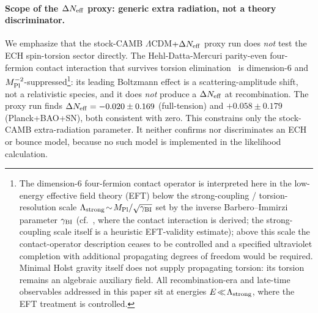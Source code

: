 \documentclass[aps,prd,twocolumn,superscriptaddress,showpacs,preprintnumbers,nofootinbib,longbibliography,floatfix]{revtex4-2}
\newcommand{\MPl}{M_{\rm Pl}}
\newcommand{\Neff}{N_{\rm eff}}
\newcommand{\cf}{cf.}
\begin{document}
\paragraph{Scope of the $\Delta\Neff$ proxy: generic extra radiation, not a theory discriminator.}
We emphasize that the stock-CAMB $\Lambda$CDM$+\Delta\Neff$ proxy run does
\emph{not} test the ECH spin-torsion sector directly. The Hehl-Datta-Mercuri
parity-even four-fermion contact interaction that survives torsion
elimination~\cite{Hehl1976,Mercuri2006} is dimension-6 and $M_{\rm Pl}^{-2}$-suppressed\footnote{The
dimension-6 four-fermion contact operator is interpreted here in the
low-energy effective field theory (EFT) below the strong-coupling /
torsion-resolution scale $\Lambda_{\rm strong}\!\sim\!\MPl/\sqrt{\gamma_{\rm BI}}$
set by the inverse Barbero--Immirzi parameter $\gamma_{\rm BI}$
(\cf~\cite{Mercuri2006}, where the contact interaction is derived; the
strong-coupling scale itself is a heuristic EFT-validity estimate); above this scale the contact-operator description
ceases to be controlled and a specified ultraviolet completion with additional
propagating degrees of freedom would be required. Minimal Holst gravity itself
does not supply propagating torsion: its torsion remains an algebraic auxiliary
field. All recombination-era and late-time observables addressed
in this paper sit at energies $E\!\ll\!\Lambda_{\rm strong}$, where the EFT
treatment is controlled.}:
its leading Boltzmann effect is a scattering-amplitude shift, not a
relativistic species, and it does \emph{not} produce a $\Delta\Neff$ at
recombination. The proxy run finds $\Delta\Neff = -0.020 \pm 0.169$
(full-tension) and $+0.058\pm 0.179$ (Planck+BAO+SN), both consistent with zero.
This constrains only the stock-CAMB extra-radiation parameter. It neither
confirms nor discriminates an ECH or bounce model, because no such model is
implemented in the likelihood calculation.
\end{document}

